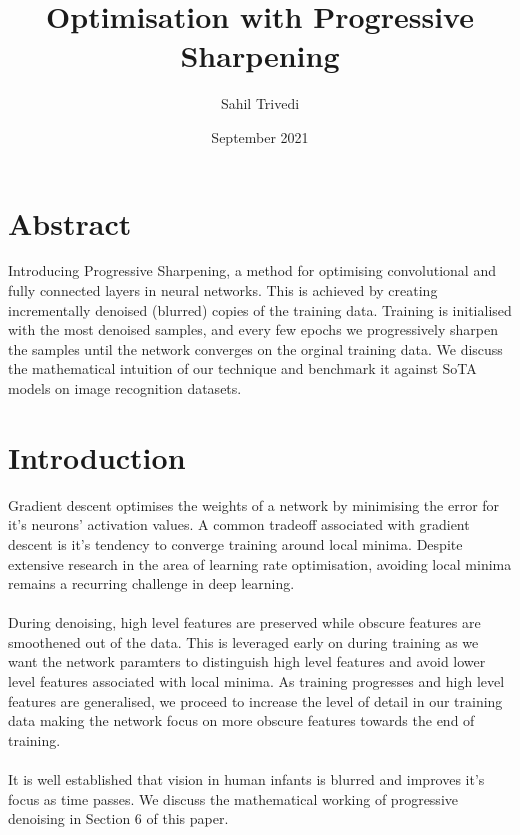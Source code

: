 \documentclass[12pt]{article}
\date{September 2021}
\title{Optimisation with Progressive Sharpening}
\author{Sahil Trivedi}
\begin{document}
	\maketitle
	
	\begin{multicols}{2}
		\section{Abstract}
		Introducing Progressive Sharpening, a method for optimising convolutional and fully connected layers in neural networks. This is achieved by creating incrementally denoised (blurred) copies of the training data. Training is initialised with the most denoised samples, and every few epochs we progressively sharpen the samples until the network converges on the orginal training data. We discuss the mathematical intuition of our technique and benchmark it against SoTA models on image recognition datasets. 
		
		\section{Introduction}
		Gradient descent optimises the weights of a network by minimising the error for it's neurons' activation values. A common tradeoff associated with gradient descent is it's tendency to converge training around local minima. Despite extensive research in the area of learning rate optimisation, avoiding local minima remains a recurring challenge in deep learning.
		\\\\
		During denoising, high level features are preserved while obscure features are smoothened out of the data. This is leveraged early on during training as we want the network paramters to distinguish high level features and avoid lower level features associated with local minima. As training progresses and high level features are generalised, we proceed to increase the level of detail in our training data making the network focus on more obscure features towards the end of training.
		\\\\
		It is well established that vision in human infants is blurred and improves it's focus as time passes. We discuss the mathematical working of progressive denoising in Section 6 of this paper.  
		

\end{multicols}
\end{document}
